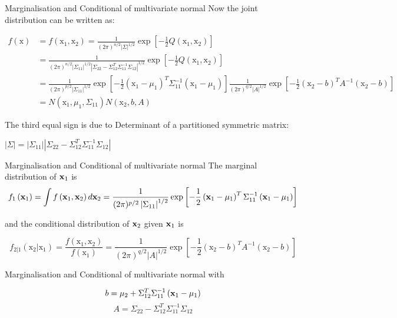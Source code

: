 \documentclass{beamer}
\begin{document}
\begin{frame}{Marginalisation and Conditional of multivariate normal}
	Now the joint distribution can be written as: 
	
	$$\begin{aligned} f(\mathrm{x}) &=f\left(\mathrm{x}_{1}, \mathrm{x}_{2}\right)=\frac{1}{(2 \pi)^{n / 2}\vert\Sigma\vert^{1 / 2}} \exp \left[-\frac{1}{2} Q\left(\mathrm{x}_{1}, \mathrm{x}_{2}\right)\right] \\ &=\frac{1}{(2 \pi)^{n / 2}\left|\Sigma_{11}\right|^{1 / 2}\left|\Sigma_{22}-\Sigma_{12}^{T} \Sigma_{11}^{-1} \Sigma_{12}\right|^{1 / 2}} \exp \left[-\frac{1}{2} Q\left(\mathrm{x}_{1}, \mathrm{x}_{2}\right)\right] \\ &=\frac{1}{(2 \pi)^{p / 2}\left|\Sigma_{11}\right|^{1 / 2}} \exp \left[-\frac{1}{2}\left(\mathrm{x}_{1}-\mu_{1}\right)^{T} \Sigma_{11}^{-1}\left(\mathrm{x}_{1}-\mu_{1}\right)\right] \frac{1}{(2 \pi)^{q / 2}|A|^{1 / 2}} \exp \left[-\frac{1}{2}\left(\mathrm{x}_{2}-b\right)^{T} A^{-1}\left(\mathrm{x}_{2}-b\right)\right] \\ &=N\left(\mathrm{x}_{1}, \mu_{1}, \Sigma_{11}\right) N\left(\mathrm{x}_{2}, b, A\right) \end{aligned}$$
	
	The third equal sign is due to Determinant of a partitioned symmetric matrix:
	
	$|\Sigma|=\left|\Sigma_{11}\right|\left|\Sigma_{22}-\Sigma_{12}^{T} \Sigma_{11}^{-1} \Sigma_{12}\right|$
\end{frame}

\begin{frame}{Marginalisation and Conditional of multivariate normal}
	The marginal distribution of $\mathbf{x}_1$ is 
	$$f_{1}\left(\mathbf{x}_{1}\right)=\int f\left(\mathbf{x}_{1}, \mathbf{x}_{2}\right) d \mathbf{x}_{2}=\frac{1}{(2 \pi)^{p / 2}\left|\Sigma_{11}\right|^{1 / 2}} \exp \left[-\frac{1}{2}\left(\mathbf{x}_{1}-\mu_{1}\right)^{T} \Sigma_{11}^{-1}\left(\mathbf{x}_{1}-\mu_{1}\right)\right]$$
	
	and the conditional distribution of $\mathbf{x}_2$ given $\mathbf{x}_1$ is 
	
	$$f_{2 | 1}\left(\mathrm{x}_{2} | \mathrm{x}_{1}\right)=\frac{f\left(\mathrm{x}_{1}, \mathrm{x}_{2}\right)}{f\left(\mathrm{x}_{1}\right)}=\frac{1}{(2 \pi)^{q / 2}|A|^{1 / 2}} \exp \left[-\frac{1}{2}\left(\mathrm{x}_{2}-b\right)^{T} A^{-1}\left(\mathrm{x}_{2}-b\right)\right]$$
\end{frame}

\begin{frame}{Marginalisation and Conditional of multivariate normal}
	with
	
	$$b=\mu_{2}+\Sigma_{12}^{T} \Sigma_{11}^{-1}\left(\mathbf{x}_{1}-\mu_{1}\right)$$
	\[
	A=\Sigma_{22}-\Sigma_{12}^{T} \Sigma_{11}^{-1} \Sigma_{12}
	\]
\end{frame}


%
%
\end{document}
